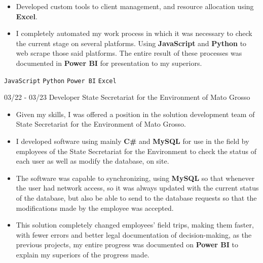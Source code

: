 \documentclass[9pt]{developercv} %
\begin{document}
\begin{entrylist}
{\begin{itemize}[noitemsep,topsep=0pt,parsep=0pt,partopsep=0pt, leftmargin=-1pt]
            \vspace{2.5pt}
            \item {Developed custom tools to client management, and resource allocation using \textbf{Excel}.}
            \vspace{2.5pt}
            \item {I completely automated my work process in which it was necessary to check the current stage on several platforms. Using \textbf{JavaScript} and \textbf{Python} to web scrape those said platforms. The entire result of these processes was documented in \textbf{Power BI} for presentation to my superiors.}
        \end{itemize} 
        \texttt{JavaScript} \slashsep \texttt{Python} \slashsep \texttt{Power BI} \slashsep \texttt{Excel}}
        \entry
		{03/22 - 03/23}
		{\normalsize Developer}
		{\normalsize State Secretariat for the Environment of Mato Grosso}
		{\vspace{-10pt}
        \vspace{2.5pt}
        \begin{itemize}[noitemsep,topsep=0pt,parsep=0pt,partopsep=0pt, leftmargin=-1pt]
            \item {Given my skills, I was offered a position in the solution development team of State Secretariat for the Environment of Mato Grosso.}
            \vspace{2.5pt}
            \item {I developed software using mainly \textbf{C\#} and \textbf{MySQL}  for use in the field by employees of the State Secretariat for the Environment to check the status of each user as well as modify the database, on site.}
            \vspace{2.5pt}
            \item {The software was capable to synchronizing, using \textbf{MySQL} so that whenever the user had network access, so it was always updated with the current status of the database, but also be able to send to the database requests so that the modifications made by the employee was accepted.}
            \vspace{2.5pt}
            \item {This solution completely changed employees' field trips, making them faster, with fewer errors and better legal documentation of decision-making, as the previous projects, my entire progress was documented on \textbf{Power BI} to explain my superiors of the progress made.}
        \end{itemize} 
}
\end{entrylist}
\end{document}
